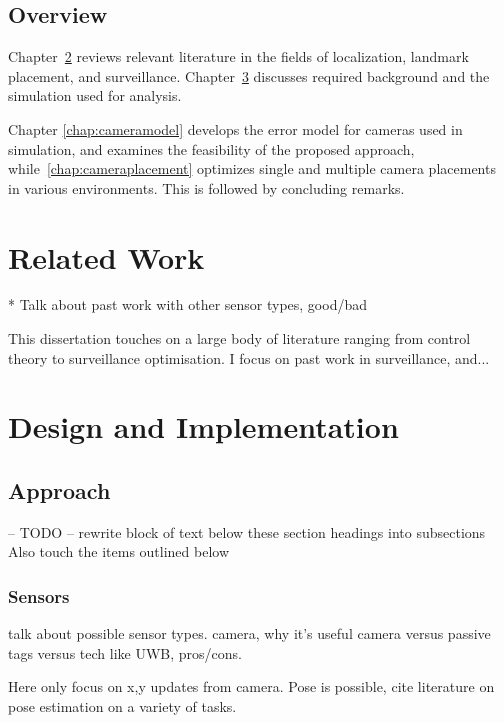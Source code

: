 \documentclass[a4paper,12pt,twoside,openright]{report}
\begin{document}
\section{Overview}

Chapter~\ref{chap:relatedwork} reviews relevant literature in the fields of
localization, landmark placement, and surveillance. Chapter~\ref{chap:impl} discusses required background and the simulation
used for analysis. 

Chapter \ref{chap:cameramodel} develops the error model for cameras
used in simulation, and examines the feasibility of the proposed approach,
while~\ref{chap:cameraplacement} optimizes single and multiple camera placements
in various environments. This is followed by concluding remarks.


\chapter{Related Work} 
\label{chap:relatedwork}

* Talk about past work with other sensor types, good/bad

This dissertation touches on a large body of literature ranging from 
control theory to surveillance optimisation. I focus on past work
in surveillance, and... 

\chapter{Design and Implementation}
\label{chap:impl}

\section{Approach}


-- TODO --
rewrite block of text below these section headings into subsections
Also touch the items outlined below

\subsection{Sensors}

talk about possible sensor types. camera, why it's useful
camera versus passive tags versus tech like UWB, pros/cons.

Here only focus on x,y updates from camera. Pose is possible, cite literature on pose estimation
on a variety of tasks. 
\end{document}

